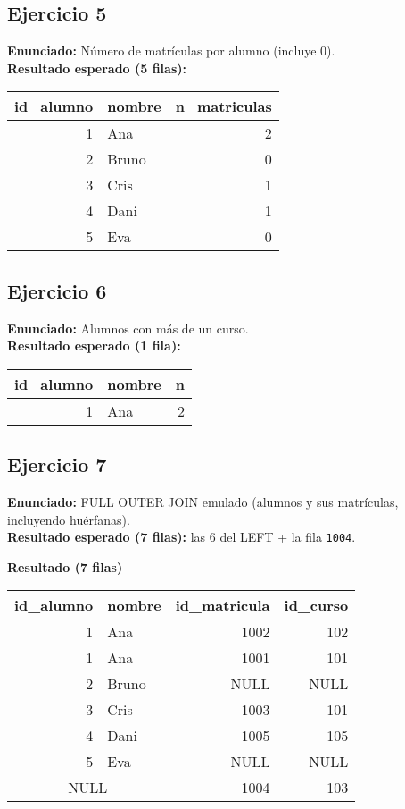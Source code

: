 \documentclass[11pt,a4paper]{article}
\begin{document}
\subsection*{Ejercicio 5}
\textbf{Enunciado:} Número de matrículas por alumno (incluye 0).\\
\textbf{Resultado esperado (5 filas):}
\begin{center}
\begin{tabular}{r l r}
\toprule
id\_alumno & nombre & n\_matriculas \\
\midrule
1 & Ana   & 2 \\
2 & Bruno & 0 \\
3 & Cris  & 1 \\
4 & Dani  & 1 \\
5 & Eva   & 0 \\
\bottomrule
\end{tabular}
\end{center}

\subsection*{Ejercicio 6}
\textbf{Enunciado:} Alumnos con más de un curso.\\
\textbf{Resultado esperado (1 fila):}
\begin{center}
\begin{tabular}{r l r}
\toprule
id\_alumno & nombre & n \\
\midrule
1 & Ana & 2 \\
\bottomrule
\end{tabular}
\end{center}

\subsection*{Ejercicio 7}
\textbf{Enunciado:} FULL OUTER JOIN emulado (alumnos y sus matrículas, incluyendo huérfanas).\\
\textbf{Resultado esperado (7 filas):} las 6 del LEFT + la fila \texttt{1004}.

\textbf{Resultado (7 filas)}
\begin{center}
\begin{tabular}{r l r r}
\toprule
id\_alumno & nombre & id\_matricula & id\_curso \\
\midrule
1   & Ana   & 1002 & 102 \\
1   & Ana   & 1001 & 101 \\
2   & Bruno & NULL & NULL \\
3   & Cris  & 1003 & 101 \\
4   & Dani  & 1005 & 105 \\
5   & Eva   & NULL & NULL \\
\multicolumn{2}{c}{NULL} & 1004 & 103 \\
\bottomrule
\end{tabular}
\end{center}
\end{document}
